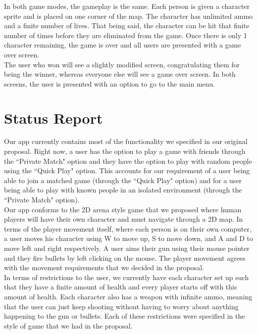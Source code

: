 \documentclass[11pt, oneside]{article}   	%
\begin{document}
In both game modes, the gameplay is the same. Each person is given a character sprite
and is placed on one corner of the map. The character has unlimited ammo and a finite number of lives.
That being said, the character can be hit that finite number of times before they are eliminated
from the game. Once there is only 1 character remaining, the game is over and all users
are presented with a game over screen.\\

The user who won will see a slightly modified screen, congratulating them for being
the winner, whereas everyone else will see a game over screen. In both screens,
the user is presented with an option to go to the main menu.


\section{Status Report}
\hspace*{5mm}
Our app currently contains most of the functionality we specified in our original
proposal. Right now, a user has the option to play a game with friends through the
``Private Match" option and they have the option to play with random people using
the ``Quick Play" option. This accounts for our requirement of a user being able to
join a matched game (through the ``Quick Play" option) and for a user being able to play
with known people in an isolated environment (through the ``Private Match" option).\\

Our app conforms to the 2D arena style game that we proposed where human players will
have their own character and must navigate through a 2D map. In terms of the player
movement itself, where each person is on their own computer, a user moves his character
using W to move up, S to move down, and A and D to move left and right respectively.
A user aims their gun using their mouse pointer and they fire bullets by left clicking
on the mouse. The player movement agrees with the movement requirements that we decided
in the proposal.\\

In terms of restrictions
to the user, we currently have each character set up such that they have a finite amount of
health and every player starts off with this amount of health. Each character also
has a weapon with infinite ammo, meaning that the user can just keep shooting without
having to worry about anything happening to the gun or bullets. Each of these restrictions
were specified in the style of game that we had in the proposal.\\
\end{document}
